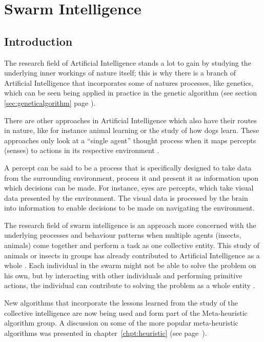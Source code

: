 \chapter{Swarm Intelligence}
\label{chpt:swarm}
\section{Introduction}
The research field of Artificial Intelligence stands a lot to gain by studying the underlying inner workings of nature itself; this is why there is a branch of Artificial Intelligence that incorporates some of natures processes, like genetics, which can be seen being applied in practice in the genetic algorithm (see section \ref{sec:geneticalgorithm} page \pageref{sec:geneticalgorithm}).

 There are other approaches in Artificial Intelligence which also have their routes in nature, like for instance animal learning or the study of how dogs learn\cite{DLearning}. These approaches only look at a “single agent” thought process when it maps percepts (senses) to actions in its respective environment \cite{DLearning}. 
 
 A percept can be said to be a process that is specifically designed to take data from the surrounding environment, process it and present it as information upon which decisions can be made\cite{DLearning,AIModernApproach}. For instance, eyes are percepts, which take visual data presented by the environment\cite{DLearning,AIModernApproach}. The visual data is processed by the brain into information to enable decisions to be made on navigating the environment\cite{DLearning,AIModernApproach}.

The research field of swarm intelligence is an approach more concerned with the underlying processes and behaviour patterns when multiple agents (insects, animals) come together and perform a task as one collective entity\cite{DLearning,AIModernApproach,ChaoticSwarmIntel,BeeJobShop}.  This study of animals or insects in groups has already contributed to Artificial Intelligence as a whole \cite{ChaoticSwarmIntel,BeeJobShop}. Each individual in the swarm might not be able to solve the problem on his own, but by interacting with other individuals and performing primitive actions, the individual can contribute to solving the problem as a whole entity \cite{BeeJobShop}. 

New algorithms that incorporate the lessons learned from the study of the collective intelligence are now being used and form part of the Meta-heuristic algorithm group. A discussion on some of the more popular meta-heuristic algorithms was presented in chapter~\ref{chpt:heuristic} (see page~\pageref{chpt:heuristic}).

